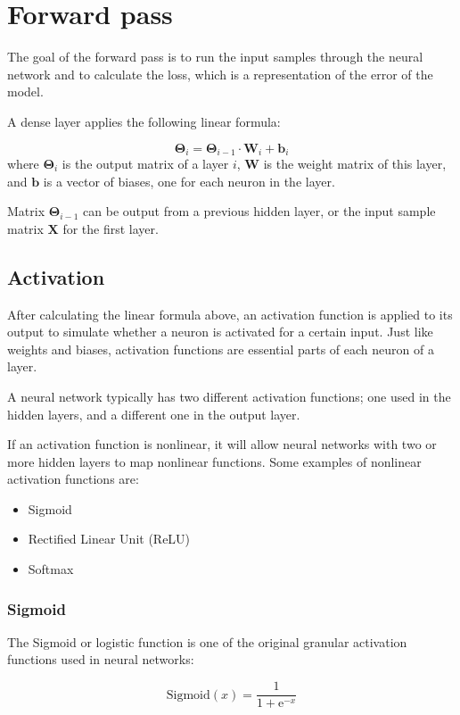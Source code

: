 \documentclass[a4paper]{article}
\newcommand{\euler}{\mathrm{e}}
\newcommand{\matr}[1]{\mathbf{#1}}
\newcommand{\vect}[1]{\bm{#1}}
\begin{document}
\section*{Forward pass}
The goal of the forward pass is to run the input samples through the neural network and to calculate the loss, which is a representation of the error of the model.

A dense layer applies the following linear formula:

\begin{equation*}
    \matr{\Theta}_i = \matr{\Theta}_{i-1} \cdot \matr{W}_i + \bm{b}_i
\end{equation*}
where $\matr{\Theta}_i$ is the output matrix of a layer $i$, $\matr{W}$ is the weight matrix of this layer, and $\vect{b}$ is a vector of biases, one for each neuron in the layer.

Matrix $\matr{\Theta}_{i-1}$ can be output from a previous hidden layer, or the input sample matrix $\matr{X}$ for the first layer.

\subsection*{Activation}
After calculating the linear formula above, an activation function is applied to its output to simulate whether a neuron is activated for a certain input. Just like weights and biases, activation functions are essential parts of each neuron of a layer.

A neural network typically has two different activation functions; one used in the hidden layers, and a different one in the output layer.

If an activation function is nonlinear, it will allow neural networks with two or more hidden layers to map nonlinear functions. Some examples of nonlinear activation functions are:
\begin{itemize}
    \item Sigmoid
    \item Rectified Linear Unit (ReLU)
    \item Softmax
\end{itemize}

\subsubsection*{Sigmoid}
The Sigmoid or logistic function is one of the original granular activation functions used in neural networks:

\begin{equation*}
    \text{Sigmoid}(x) = \frac{1}{1 + \euler^{-x}}
\end{equation*}
\end{document}
